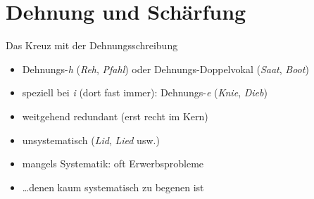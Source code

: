 \section{Dehnung und Schärfung}

\begin{frame}
  {Das Kreuz mit der Dehnungsschreibung}
  \pause
  \begin{itemize}[<+->]
    \item Dehnungs-\textit{h} (\textit{Reh}, \textit{Pfahl}) oder Dehnungs-Doppelvokal (\textit{Saat}, \textit{Boot})
    \item speziell bei \textit{i} (dort fast immer): Dehnungs-\textit{e} (\textit{Knie}, \textit{Dieb})
      \Halbzeile
    \item \alert{weitgehend redundant} (erst recht im Kern)
    \item \alert{unsystematisch} (\textit{Lid}, \textit{Lied} usw.)
      \Halbzeile
    \item mangels Systematik: \alert{oft Erwerbsprobleme}
    \item \ldots denen kaum systematisch zu begenen ist
  \end{itemize}
\end{frame}

